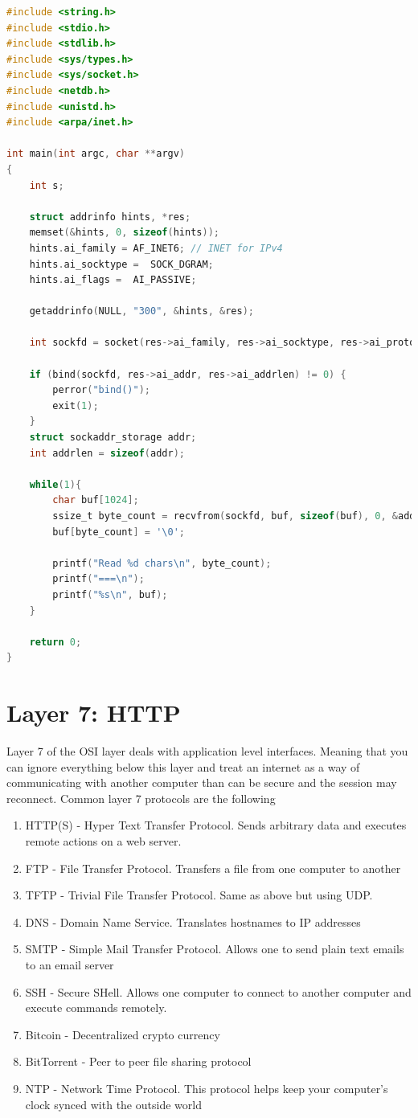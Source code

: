 \begin{lstlisting}[language=C]
#include <string.h>
#include <stdio.h>
#include <stdlib.h>
#include <sys/types.h>
#include <sys/socket.h>
#include <netdb.h>
#include <unistd.h>
#include <arpa/inet.h>

int main(int argc, char **argv)
{
    int s;

    struct addrinfo hints, *res;
    memset(&hints, 0, sizeof(hints));
    hints.ai_family = AF_INET6; // INET for IPv4
    hints.ai_socktype =  SOCK_DGRAM;
    hints.ai_flags =  AI_PASSIVE;

    getaddrinfo(NULL, "300", &hints, &res);

    int sockfd = socket(res->ai_family, res->ai_socktype, res->ai_protocol);

    if (bind(sockfd, res->ai_addr, res->ai_addrlen) != 0) {
        perror("bind()");
        exit(1);
    }
    struct sockaddr_storage addr;
    int addrlen = sizeof(addr);

    while(1){
        char buf[1024];
        ssize_t byte_count = recvfrom(sockfd, buf, sizeof(buf), 0, &addr, &addrlen);
        buf[byte_count] = '\0';

        printf("Read %d chars\n", byte_count);
        printf("===\n");
        printf("%s\n", buf);
    }

    return 0;
}
\end{lstlisting}


\section{Layer 7: HTTP}

Layer 7 of the OSI layer deals with application level interfaces.
Meaning that you can ignore everything below this layer and treat an internet as a way of communicating with another computer than can be secure and the session may reconnect.
Common layer 7 protocols are the following

\begin{enumerate}
  \item HTTP(S) - Hyper Text Transfer Protocol.
    Sends arbitrary data and executes remote actions on a web server.
  \item FTP - File Transfer Protocol.
    Transfers a file from one computer to another
  \item TFTP - Trivial File Transfer Protocol.
    Same as above but using UDP.
  \item DNS - Domain Name Service.
    Translates hostnames to IP addresses
  \item SMTP - Simple Mail Transfer Protocol.
    Allows one to send plain text emails to an email server
  \item SSH - Secure SHell.
    Allows one computer to connect to another computer and execute commands remotely.
  \item Bitcoin - Decentralized crypto currency
  \item BitTorrent - Peer to peer file sharing protocol
  \item NTP - Network Time Protocol.
    This protocol helps keep your computer's clock synced with the outside world
\end{enumerate}

